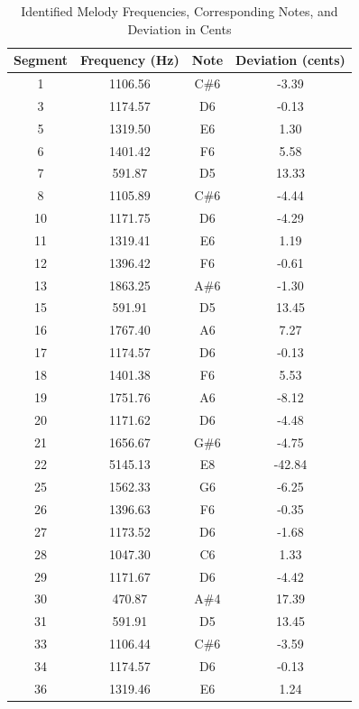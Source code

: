 \begin{table}[h]
    \centering
    \caption{Identified Melody Frequencies, Corresponding Notes, and Deviation in Cents}
    \begin{tabular}{cccc}
        \hline
        Segment & Frequency (Hz) & Note & Deviation (cents) \\
        \hline
        1  & 1106.56 & C\#6  & -3.39   \\
        3  & 1174.57 & D6    & -0.13   \\
        5  & 1319.50 & E6    & 1.30    \\
        6  & 1401.42 & F6    & 5.58    \\
        7  & 591.87  & D5    & 13.33   \\
        8  & 1105.89 & C\#6  & -4.44   \\
        10 & 1171.75 & D6    & -4.29   \\
        11 & 1319.41 & E6    & 1.19    \\
        12 & 1396.42 & F6    & -0.61   \\
        13 & 1863.25 & A\#6  & -1.30   \\
        15 & 591.91  & D5    & 13.45   \\
        16 & 1767.40 & A6    & 7.27    \\
        17 & 1174.57 & D6    & -0.13   \\
        18 & 1401.38 & F6    & 5.53    \\
        19 & 1751.76 & A6    & -8.12   \\
        20 & 1171.62 & D6    & -4.48   \\
        21 & 1656.67 & G\#6  & -4.75   \\
        22 & 5145.13 & E8    & -42.84  \\
        25 & 1562.33 & G6    & -6.25   \\
        26 & 1396.63 & F6    & -0.35   \\
        27 & 1173.52 & D6    & -1.68   \\
        28 & 1047.30 & C6    & 1.33    \\
        29 & 1171.67 & D6    & -4.42   \\
        30 & 470.87  & A\#4  & 17.39   \\
        31 & 591.91  & D5    & 13.45   \\
        33 & 1106.44 & C\#6  & -3.59   \\
        34 & 1174.57 & D6    & -0.13   \\
        36 & 1319.46 & E6    & 1.24    \\

\end{tabular}
\end{table}
